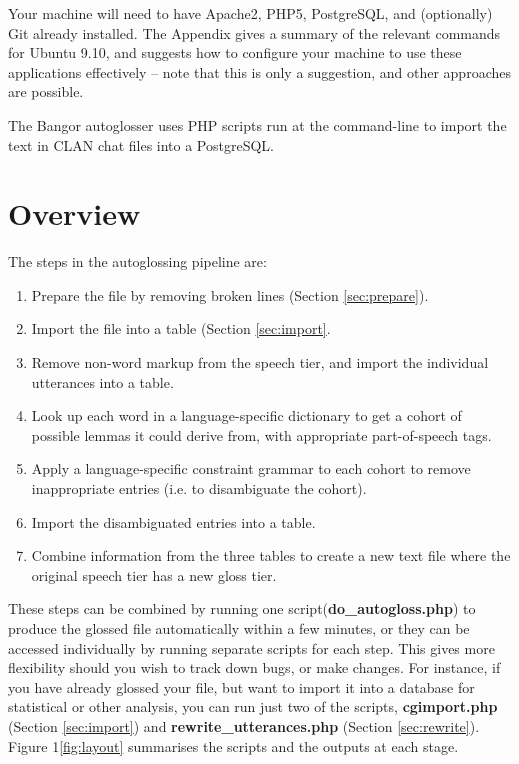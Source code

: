 \documentclass[a4paper,10pt]{article}
\begin{document}
Your machine will need to have Apache2, PHP5, PostgreSQL, and (optionally) Git already installed.  The Appendix gives a summary of the relevant commands for Ubuntu 9.10, and suggests how to configure your machine to use these applications effectively -- note that this is only a suggestion, and other approaches are possible.

The Bangor autoglosser uses PHP scripts run at the command-line to import the text in CLAN chat files into a PostgreSQL.


\section{Overview}
\label{sec:overview}

The steps in the autoglossing pipeline are:
\begin{enumerate}
\item Prepare the file by removing broken lines (Section \ref{sec:prepare}).
\item Import the file into a table (Section \ref{sec:import}.
\item Remove non-word markup from the speech tier, and import the individual utterances into a table.
\item Look up each word in a language-specific dictionary to get a cohort of possible lemmas it could derive from, with appropriate part-of-speech tags.
\item Apply a language-specific constraint grammar to each cohort to remove inappropriate entries (i.e. to disambiguate the cohort).
\item Import the disambiguated entries into a table.
\item Combine information from the three tables to create a new text file where the original speech tier has a new gloss tier.
\end{enumerate}

These steps can be combined by running one script(\textbf{do\_autogloss.php}) to produce the glossed file automatically within a few minutes, or they can be accessed individually by running separate scripts for each step.  This gives more flexibility should you wish to track down bugs, or make changes.  For instance, if you have already glossed your file, but want to import it into a database for statistical or other analysis, you can run just two of the scripts, \textbf{cgimport.php} (Section \ref{sec:import}) and \textbf{rewrite\_utterances.php} (Section \ref{sec:rewrite}).  Figure 1\ref{fig:layout} summarises the scripts and the outputs at each stage.
\end{document}
